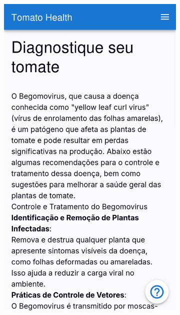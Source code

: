 \begin{figure}[htp]
\begin{subfigure}{0.3\textwidth}
        \includegraphics[width=\linewidth, height=0.4\textheight, keepaspectratio]{images/diagnostic5.png}
    \end{subfigure}
    
    \vspace{0.5cm}
    

\end{figure}
